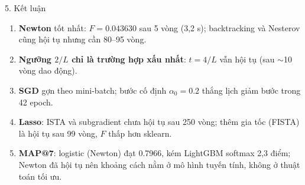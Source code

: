 \documentclass[aspectratio=169, 11pt]{beamer}
\begin{document}
\begin{frame}{5. Kết luận}
  \begin{enumerate}
    \item \textbf{Newton} tốt nhất: $F=0.043630$ sau 5 vòng (3,2 s); backtracking và Nesterov cũng hội tụ nhưng cần 80--95 vòng.
    \item \textbf{Ngưỡng $2/L$ chỉ là trường hợp xấu nhất}: $t=4/L$ vẫn hội tụ (sau $\sim$10 vòng dao động).
    \item \textbf{SGD} gợn theo mini-batch; bước cố định $\alpha_0=0.2$ thắng lịch giảm bước trong 42 epoch.
    \item \textbf{Lasso}: ISTA và subgradient chưa hội tụ sau 250 vòng; thêm gia tốc (FISTA) là hội tụ sau 99 vòng, $F$ thấp hơn sklearn.
    \item \textbf{MAP@7}: logistic (Newton) đạt 0.7966, kém LightGBM softmax 2,3 điểm; Newton đã hội tụ nên khoảng cách nằm ở mô hình tuyến tính, không ở thuật toán tối ưu.
  \end{enumerate}
\end{frame}
\end{document}
